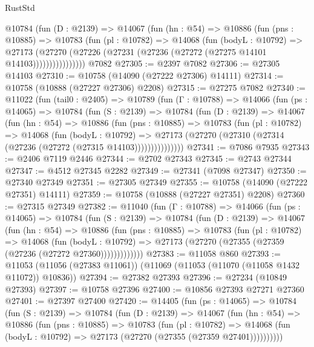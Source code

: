 \begin{lexlean}{RustStd}
\begin{coremodule}
            @10784
              (fun (D : @2139) =>
              @14067
                (fun (hn : @54) =>
                @10886
                  (fun (pns : @10885) =>
                  @10783
                    (fun (pl : @10782) =>
                    @14068
                      (fun (bodyL : @10792) =>
                      @27173
                        (@27270
                          (@27226 (@27231 (@27236 (@27272 (@27275 @14101 @14103))))))))))))))))
    @7082
@27305 := @2397 @7082
@27306 := @27305 @14103
@27310 := @10758 (@14090 (@27222 @27306) @14111)
@27314 := @10758 (@10888 (@27227 @27306) @2208)
@27315 := @27275 @7082
@27340 := @11022
    (fun (tail0 : @2405) =>
    @10789
      (fun (Γ : @10788) =>
      @14066
        (fun (ps : @14065) =>
        @10784
          (fun (S : @2139) =>
          @10784
            (fun (D : @2139) =>
            @14067
              (fun (hn : @54) =>
              @10886
                (fun (pns : @10885) =>
                @10783
                  (fun (pl : @10782) =>
                  @14068
                    (fun (bodyL : @10792) =>
                    @27173 (@27270 (@27310 (@27314 (@27236 (@27272 (@27315 @14103)))))))))))))))
@27341 := @7086 @7935
@27343 := @2406 @7119 @2446
@27344 := @2702 @27343
@27345 := @2743 @27344
@27347 := @4512 @27345 @2282
@27349 := @27341 (@7098 @27347)
@27350 := @27340 @27349
@27351 := @27305 @27349
@27355 := @10758 (@14090 (@27222 @27351) @14111)
@27359 := @10758 (@10888 (@27227 @27351) @2208)
@27360 := @27315 @27349
@27382 := @11040
    (fun (Γ : @10788) =>
    @14066
      (fun (ps : @14065) =>
      @10784
        (fun (S : @2139) =>
        @10784
          (fun (D : @2139) =>
          @14067
            (fun (hn : @54) =>
            @10886
              (fun (pns : @10885) =>
              @10783
                (fun (pl : @10782) =>
                @14068
                  (fun (bodyL : @10792) =>
                  @27173 (@27270 (@27355 (@27359 (@27236 (@27272 @27360)))))))))))))
@27383 := @11058 @860
@27393 := @11053 (@11056 (@27383 @11061)) (@11069 (@11053 (@11070 (@11058 @1432 @11072)) @10836))
@27394 := @27382 @27393
@27396 := @27234 (@10849 @27393)
@27397 := @10758 @27396
@27400 := @10856 @27393 @27271 @27360
@27401 := @27397 @27400
@27420 := @14405
    (fun (ps : @14065) =>
    @10784
      (fun (S : @2139) =>
      @10784
        (fun (D : @2139) =>
        @14067
          (fun (hn : @54) =>
          @10886
            (fun (pns : @10885) =>
            @10783
              (fun (pl : @10782) =>
              @14068 (fun (bodyL : @10792) => @27173 (@27270 (@27355 (@27359 @27401))))))))))

\end{coremodule}
\end{lexlean}
